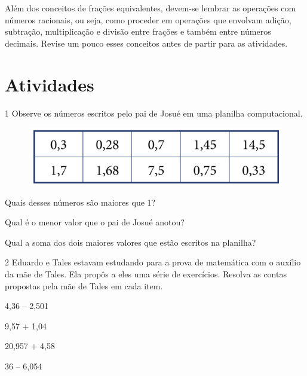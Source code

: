 {Além dos conceitos de frações equivalentes, devem-se lembrar as operações
com números racionais, ou seja, como proceder em operações que envolvam
adição, subtração, multiplicação e divisão entre frações e também entre
números decimais. Revise um pouco esses conceitos antes de partir para as atividades.}

\pagebreak
\section*{Atividades}

\num{1} Observe os números escritos pelo pai de Josué em uma planilha computacional.

\begin{figure}[htpb!]
\centering
\includegraphics[width=.6\textwidth]{../ilustracoes/MAT5/SAEB_5ANO_MAT_figura86.png}
\end{figure}

\begin{escolha}
\item
  Quais desses números são maiores que 1?\\
\item
  Qual é o menor valor que o pai de Josué anotou?\\
\item
  Qual a soma dos dois maiores valores que estão escritos na planilha?\\
\end{escolha}


\num{2} Eduardo e Tales estavam estudando para a prova de matemática com o
auxílio da mãe de Tales. Ela propôs a eles uma série de exercícios.
Resolva as contas propostas pela mãe de Tales em cada item.

\begin{escolha}
\item
  4,36 – 2,501\\

\item
  9,57 + 1,04\\

\item
  20,957 + 4,58\\

\item
  36 – 6,054\\
\end{escolha}

